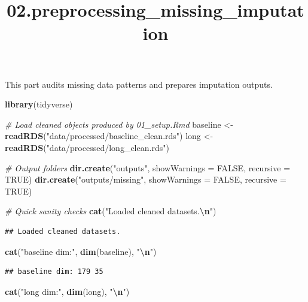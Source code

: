 \documentclass[
]{article}
\title{02.preprocessing\_missing\_imputation}
\author{}
\date{\vspace{-2.5em}}
\newenvironment{Shaded}{\begin{snugshade}}{\end{snugshade}}
\newcommand{\AttributeTok}[1]{\textcolor[rgb]{0.13,0.29,0.53}{#1}}
\newcommand{\CommentTok}[1]{\textcolor[rgb]{0.56,0.35,0.01}{\textit{#1}}}
\newcommand{\ConstantTok}[1]{\textcolor[rgb]{0.56,0.35,0.01}{#1}}
\newcommand{\FunctionTok}[1]{\textcolor[rgb]{0.13,0.29,0.53}{\textbf{#1}}}
\newcommand{\NormalTok}[1]{#1}
\newcommand{\OtherTok}[1]{\textcolor[rgb]{0.56,0.35,0.01}{#1}}
\newcommand{\SpecialCharTok}[1]{\textcolor[rgb]{0.81,0.36,0.00}{\textbf{#1}}}
\newcommand{\StringTok}[1]{\textcolor[rgb]{0.31,0.60,0.02}{#1}}
\begin{document}
\maketitle

This part audits missing data patterns and prepares imputation outputs.

\begin{Shaded}
\begin{Highlighting}[]
\FunctionTok{library}\NormalTok{(tidyverse)}

\CommentTok{\# Load cleaned objects produced by 01\_setup.Rmd}
\NormalTok{baseline }\OtherTok{\textless{}{-}} \FunctionTok{readRDS}\NormalTok{(}\StringTok{"data/processed/baseline\_clean.rds"}\NormalTok{)}
\NormalTok{long }\OtherTok{\textless{}{-}} \FunctionTok{readRDS}\NormalTok{(}\StringTok{"data/processed/long\_clean.rds"}\NormalTok{)}

\CommentTok{\# Output folders}
\FunctionTok{dir.create}\NormalTok{(}\StringTok{"outputs"}\NormalTok{, }\AttributeTok{showWarnings =} \ConstantTok{FALSE}\NormalTok{, }\AttributeTok{recursive =} \ConstantTok{TRUE}\NormalTok{)}
\FunctionTok{dir.create}\NormalTok{(}\StringTok{"outputs/missing"}\NormalTok{, }\AttributeTok{showWarnings =} \ConstantTok{FALSE}\NormalTok{, }\AttributeTok{recursive =} \ConstantTok{TRUE}\NormalTok{)}

\CommentTok{\# Quick sanity checks}
\FunctionTok{cat}\NormalTok{(}\StringTok{"Loaded cleaned datasets.}\SpecialCharTok{\textbackslash{}n}\StringTok{"}\NormalTok{)}
\end{Highlighting}
\end{Shaded}

\begin{verbatim}
## Loaded cleaned datasets.
\end{verbatim}

\begin{Shaded}
\begin{Highlighting}[]
\FunctionTok{cat}\NormalTok{(}\StringTok{"baseline dim:"}\NormalTok{, }\FunctionTok{dim}\NormalTok{(baseline), }\StringTok{"}\SpecialCharTok{\textbackslash{}n}\StringTok{"}\NormalTok{)}
\end{Highlighting}
\end{Shaded}

\begin{verbatim}
## baseline dim: 179 35
\end{verbatim}

\begin{Shaded}
\begin{Highlighting}[]
\FunctionTok{cat}\NormalTok{(}\StringTok{"long dim:"}\NormalTok{, }\FunctionTok{dim}\NormalTok{(long), }\StringTok{"}\SpecialCharTok{\textbackslash{}n}\StringTok{"}\NormalTok{)}
\end{Highlighting}
\end{Shaded}
\end{document}
